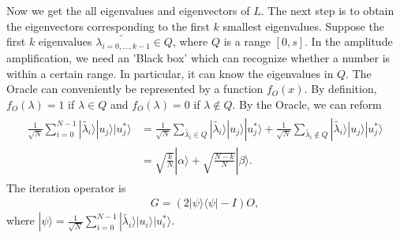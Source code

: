 \documentclass[onecolumn,notitlepage]{revtex4-1}
\def\ket#1{| #1 \rangle}
\def\bra#1{\langle #1 |}
\begin{document}
Now we get the all eigenvalues and eigenvectors of $L$. 
The next step is to obtain the eigenvectors corresponding to the first $k$ smallest eigenvalues.
Suppose the first $k$ eigenvalues $\tilde{\lambda_{i=0,...,k-1}} \in Q$, where $Q$ is a range $[0,s]$. 
In the amplitude amplification, we need an 'Black box' which can recognize whether a number is within a certain range. 
In particular, it can know the eigenvalues in $Q$. 
The Oracle can conveniently be represented by a function $f_{O}(x)$. 
By definition, $f_{O}(\lambda)=1$ if $\lambda \in Q$ and $f_{O}(\lambda)=0$ if $\lambda \notin Q$. 
By the Oracle, we can reform
\begin{align}
    \begin{split}
        \frac{1}{\sqrt{N}}\sum_{i=0}^{N-1}\ket{\tilde{\lambda_{i}}}\ket{u_{j}}\ket{u_{j}^{*}} &= \frac{1}{\sqrt{N}}\sum_{\tilde{\lambda_{i}}\in Q}\ket{\tilde{\lambda_{i}}}\ket{u_{j}}\ket{u_{j}^{*}} + \frac{1}{\sqrt{N}}\sum_{\tilde{\lambda_{i}}\notin Q}\ket{\tilde{\lambda_{i}}}\ket{u_{j}}\ket{u_{j}^{*}}\\
        &=\sqrt{\frac{k}{N}}\ket{\alpha}+\sqrt{\frac{N-k}{N}}\ket{\beta}.
    \end{split}
\end{align}
The iteration operator is
\begin{align}
    G=(2\ket{\psi}\bra{\psi}-I)O,
\end{align}
where $\ket{\psi}=\frac{1}{\sqrt{N}}\sum_{i=0}^{N-1}\ket{\tilde{\lambda_{i}}}\ket{u_{i}}\ket{u_{i}^{*}}$.
\end{document}
